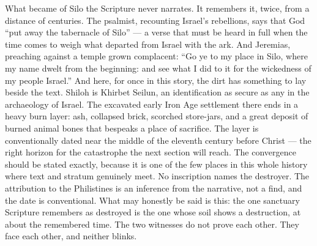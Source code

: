 What became of Silo the Scripture never narrates. It remembers it, twice,
from a distance of centuries. The psalmist, recounting Israel's
rebellions, says that God ``put away the tabernacle of
Silo'' --- a
verse that must be heard in full when the time comes to weigh what
departed from Israel with the ark.
And Jeremias, preaching against a temple grown complacent: ``Go ye to my
place in Silo, where my name dwelt from the beginning: and see what I did to
it for the wickedness of my people Israel.'' And here, for once in this story, the dirt has
something to lay beside the text. Shiloh is Khirbet Seilun, an
identification as secure as any in the archaeology of Israel. The excavated
early Iron Age settlement there ends in a heavy burn layer: ash, collapsed
brick, scorched store-jars, and a great deposit of burned animal bones that
bespeaks a place of sacrifice. The layer is conventionally dated near the
middle of the eleventh century before Christ --- the right horizon for the
catastrophe the next section will reach. The convergence should be stated exactly, because it is one
of the few places in this whole history where text and stratum genuinely
meet. No inscription names the destroyer. The attribution to the
Philistines is an inference from the narrative, not a find, and the date is
conventional. What may honestly be said is this: the one sanctuary
Scripture remembers as destroyed is the one whose soil shows a destruction,
at about the remembered time. The two witnesses do not prove each other.
They face each other, and neither blinks.

